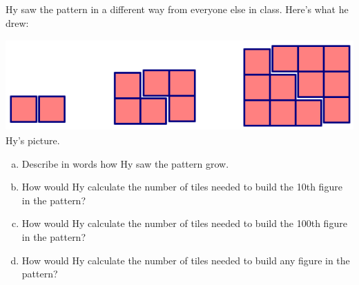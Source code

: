 \newpage


\begin{problem}
Hy saw the pattern in a different way from everyone else in class.  Here's what he drew:
\begin{center}
\includegraphics[height=3.5cm]{doubledstairs}
Hy's picture.
\end{center}
\begin{enumerate}[(a)]
\item
Describe in words how Hy saw the pattern grow.\\

\item
How would Hy calculate the number of tiles needed to build the 10th figure in the pattern?\\


\item
How would Hy calculate the number of tiles needed to build the 100th figure in the pattern?\\

\item
How would Hy calculate the number of tiles needed to build any figure in the pattern?
\end{enumerate}

\end{problem}

\newpage

